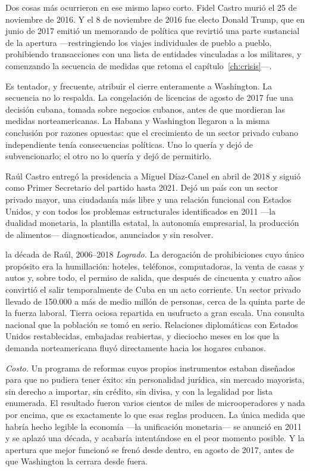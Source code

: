 Dos cosas más ocurrieron en ese mismo lapso corto. Fidel Castro murió el 25 de
noviembre de 2016. Y el 8 de noviembre de 2016 fue electo Donald Trump, que en
junio de 2017 emitió un memorando de política que revirtió una parte sustancial de
la apertura ---restringiendo los viajes individuales de pueblo a pueblo,
prohibiendo transacciones con una lista de entidades vinculadas a los militares, y
comenzando la secuencia de medidas que retoma el capítulo~\ref{ch:crisis}---.

Es tentador, y frecuente, atribuir el cierre enteramente a Washington. La
secuencia no lo respalda. La congelación de licencias de agosto de 2017 fue una
decisión cubana, tomada sobre negocios cubanos, antes de que mordieran las medidas
norteamericanas. La Habana y Washington llegaron a la misma conclusión por razones
opuestas: que el crecimiento de un sector privado cubano independiente tenía
consecuencias políticas. Uno lo quería y dejó de subvencionarlo; el otro no lo
quería y dejó de permitirlo.

Raúl Castro entregó la presidencia a Miguel Díaz-Canel en abril de 2018 y siguió
como Primer Secretario del partido hasta 2021. Dejó un país con un sector privado
mayor, una ciudadanía más libre y una relación funcional con Estados Unidos, y con
todos los problemas estructurales identificados en 2011 ---la dualidad monetaria,
la plantilla estatal, la autonomía empresarial, la producción de alimentos---
diagnosticados, anunciados y sin resolver.

\begin{ledger}{la década de Raúl, 2006--2018}
\emph{Logrado.} La derogación de prohibiciones cuyo único propósito era la
humillación: hoteles, teléfonos, computadoras, la venta de casas y autos y, sobre
todo, el permiso de salida, que después de cincuenta y cuatro años convirtió el
salir temporalmente de Cuba en un acto corriente. Un sector privado llevado de
150.000 a más de medio millón de personas, cerca de la quinta parte de la fuerza
laboral. Tierra ociosa repartida en usufructo a gran escala. Una consulta nacional
que la población se tomó en serio. Relaciones diplomáticas con Estados Unidos
restablecidas, embajadas reabiertas, y dieciocho meses en los que la demanda
norteamericana fluyó directamente hacia los hogares cubanos.

\emph{Costo.} Un programa de reformas cuyos propios instrumentos estaban diseñados
para que no pudiera tener éxito: sin personalidad jurídica, sin mercado mayorista,
sin derecho a importar, sin crédito, sin divisa, y con la legalidad por lista
enumerada. El resultado fueron varios cientos de miles de microoperadores y nada
por encima, que es exactamente lo que esas reglas producen. La única medida que
habría hecho legible la economía ---la unificación monetaria--- se anunció en 2011
y se aplazó una década, y acabaría intentándose en el peor momento posible. Y la
apertura que mejor funcionó se frenó desde dentro, en agosto de 2017, antes de que
Washington la cerrara desde fuera.
\end{ledger}
